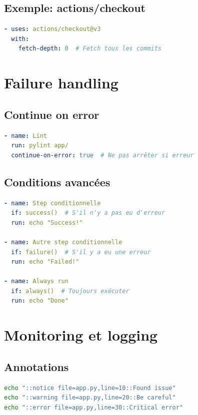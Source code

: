 \documentclass[12pt,a4paper,twoside]{report}
\begin{document}
\subsection{Exemple: actions/checkout}

\begin{lstlisting}[language=yaml]
- uses: actions/checkout@v3
  with:
    fetch-depth: 0  # Fetch tous les commits
\end{lstlisting}

\section{Failure handling}

\subsection{Continue on error}

\begin{lstlisting}[language=yaml]
- name: Lint
  run: pylint app/
  continue-on-error: true  # Ne pas arrêter si erreur
\end{lstlisting}

\subsection{Conditions avancées}

\begin{lstlisting}[language=yaml]
- name: Step conditionnelle
  if: success()  # S'il n'y a pas eu d'erreur
  run: echo "Success!"

- name: Autre step conditionnelle
  if: failure()  # S'il y a eu une erreur
  run: echo "Failed!"

- name: Always run
  if: always()  # Toujours exécuter
  run: echo "Done"
\end{lstlisting}

\section{Monitoring et logging}

\subsection{Annotations}

\begin{lstlisting}[language=bash]
echo "::notice file=app.py,line=10::Found issue"
echo "::warning file=app.py,line=20::Be careful"
echo "::error file=app.py,line=30::Critical error"
\end{lstlisting}
\end{document}
